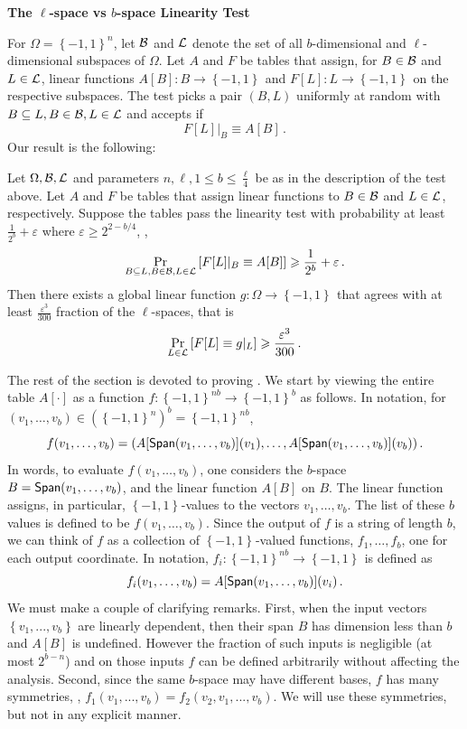 \documentclass{toc}
\newcommand\set[1]{{\left\{ #1 \right\}}}
\newcommand\Prob[2]{{\Pr_{#1}\left[ {#2} \right]}}
\newcommand\cube[1]{ { \set{-1,1}^{#1} } }
\newcommand\eps{\varepsilon}
\renewcommand\geq{\geqslant}
\renewcommand\leq{\leqslant}
\begin{document}
\begin{center} {\bf  The $\ell$-space vs $b$-space Linearity Test }
\end{center}
For  $\Omega = \cube{n}$, let ${\cal B}$  and ${\cal L}$ denote the set of all $b$-dimensional and $\ell$-dimensional
subspaces of $\Omega$. Let %
$A$ and $F$  %
be tables that assign, for
%
$B \in {\cal B}$ and $L \in {\cal L}$, %
%
linear functions %
$A[B]:B \to \cube{}$ and $F[L]:L \to \cube{}$  %
on the respective subspaces.  %
 The test picks a pair
$(B,L)$ uniformly at random with $B \subseteq L, B \in {\cal B}, L \in {\cal L}$
and accepts
if %
%
%
 $$  F[L]|_B \equiv  A[B]\,.$$%
Our result is the following:
\begin{theorem}\label{thm:linearity_dec}
Let $\Omega, {\cal B}, {\cal L}$ and parameters $n, \ell, 1 \leq b \leq \frac{\ell}{4}$
be as in the description of
the test above. Let %
$A$ and $F$  %
be tables that assign linear functions to $B \in {\cal B}$ and
$L \in {\cal L}$, respectively.  %
Suppose the tables pass the linearity test with probability at least
$\frac{1}{2^b}+\eps$ where
$\eps \geq 2^{2-b/4}$, \ie,
\[
\Prob{B\subseteq  L, B \in {\cal B}, L \in {\cal L}}{F[L]|_B\equiv A[B]}\geqslant \frac{1}{2^b}+\eps\,.%
\]
Then there exists a global linear function $g: \Omega \to \cube{} $ that agrees with at least $\frac{\eps^3}{300}$ fraction of the $\ell$-spaces,
that is
\[
\Prob{L\in {\cal L} }{F[L]\equiv g|_L}\geqslant \frac{\eps^3}{300}\,.%
\]
\end{theorem}


The rest of the section is devoted to proving . We start by viewing the entire table $A[\cdot]$ as
a function $f: \cube{nb} \to \cube{b}$ as follows. In notation, for $(v_1, \ldots, v_b) \in (\cube{n})^b = \cube{nb}$,
 $$ f(v_1,\ldots,v_b) = ( A[{\sf Span}(v_1,\ldots,v_b)] (v_1), \ldots, A[{\sf Span}(v_1,\ldots,v_b)] (v_b) )\,. $$%
In words, to evaluate  $f(v_1, \ldots, v_b)$, one considers the $b$-space $B= {\sf Span}(v_1,\ldots,v_b)$, and the
linear function $A[B]$ on $B$. The linear function assigns, in particular, $\cube{}$-values to the vectors
$v_1, \ldots, v_b$.  %
%
The list of these $b$ values is defined to be $f(v_1,\ldots,v_b)$. Since the output
of $f$ is a string of length $b$, we can think of $f$ as a collection of $\cube{}$-valued functions,
$f_1,\ldots,f_b$, one for each output coordinate. In notation,  $f_i: \cube{nb} \to \cube{}$ is defined as
  $$  f_i(v_1,\ldots,v_b) =  A[{\sf Span}(v_1,\ldots,v_b)] (v_i)\,. $$%
We must make
a couple of clarifying remarks.
First, when the input vectors $\set{v_1,...,v_b}$ are linearly dependent, then their span $B$ has dimension less than $b$ and $A[B]$
is undefined. However the fraction of such inputs is negligible (at most $2^{b-n}$) and on those inputs $f$ can be defined arbitrarily
without affecting the analysis. Second, since the same $b$-space may have different bases,
$f$ has many symmetries, \eg, $f_1(v_1,...,v_b)=f_2(v_2,v_1,...,v_b)$. We will use these symmetries, but not in any explicit manner.
\end{document}
